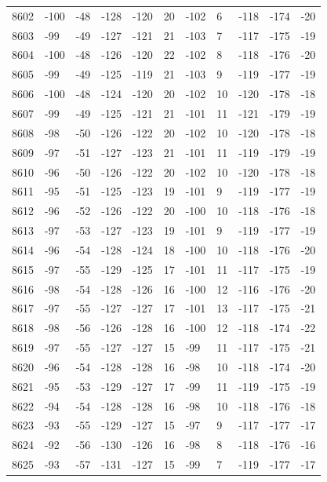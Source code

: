\begin{table}[H]
\begin{tabular}{lllllllllll}
8602 & -100 & -48 & -128 & -120 & 20 & -102 & 6 & -118 & -174 & -20 \\
8603 & -99 & -49 & -127 & -121 & 21 & -103 & 7 & -117 & -175 & -19 \\
8604 & -100 & -48 & -126 & -120 & 22 & -102 & 8 & -118 & -176 & -20 \\
8605 & -99 & -49 & -125 & -119 & 21 & -103 & 9 & -119 & -177 & -19 \\
8606 & -100 & -48 & -124 & -120 & 20 & -102 & 10 & -120 & -178 & -18 \\
8607 & -99 & -49 & -125 & -121 & 21 & -101 & 11 & -121 & -179 & -19 \\
8608 & -98 & -50 & -126 & -122 & 20 & -102 & 10 & -120 & -178 & -18 \\
8609 & -97 & -51 & -127 & -123 & 21 & -101 & 11 & -119 & -179 & -19 \\
8610 & -96 & -50 & -126 & -122 & 20 & -102 & 10 & -120 & -178 & -18 \\
8611 & -95 & -51 & -125 & -123 & 19 & -101 & 9 & -119 & -177 & -19 \\
8612 & -96 & -52 & -126 & -122 & 20 & -100 & 10 & -118 & -176 & -18 \\
8613 & -97 & -53 & -127 & -123 & 19 & -101 & 9 & -119 & -177 & -19 \\
8614 & -96 & -54 & -128 & -124 & 18 & -100 & 10 & -118 & -176 & -20 \\
8615 & -97 & -55 & -129 & -125 & 17 & -101 & 11 & -117 & -175 & -19 \\
8616 & -98 & -54 & -128 & -126 & 16 & -100 & 12 & -116 & -176 & -20 \\
8617 & -97 & -55 & -127 & -127 & 17 & -101 & 13 & -117 & -175 & -21 \\
8618 & -98 & -56 & -126 & -128 & 16 & -100 & 12 & -118 & -174 & -22 \\
8619 & -97 & -55 & -127 & -127 & 15 & -99 & 11 & -117 & -175 & -21 \\
8620 & -96 & -54 & -128 & -128 & 16 & -98 & 10 & -118 & -174 & -20 \\
8621 & -95 & -53 & -129 & -127 & 17 & -99 & 11 & -119 & -175 & -19 \\
8622 & -94 & -54 & -128 & -128 & 16 & -98 & 10 & -118 & -176 & -18 \\
8623 & -93 & -55 & -129 & -127 & 15 & -97 & 9 & -117 & -177 & -17 \\
8624 & -92 & -56 & -130 & -126 & 16 & -98 & 8 & -118 & -176 & -16 \\
8625 & -93 & -57 & -131 & -127 & 15 & -99 & 7 & -119 & -177 & -17 \\

\end{tabular}
\end{table}
